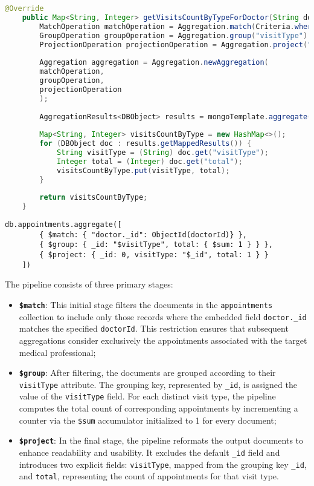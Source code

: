 \begin{lstlisting}[language=java, caption={Java code for the Visit Type Summary analytic}
	]
	@Override
	public Map<String, Integer> getVisitsCountByTypeForDoctor(String doctorId){
		MatchOperation matchOperation = Aggregation.match(Criteria.where("doctor.id").is(doctorId));
		GroupOperation groupOperation = Aggregation.group("visitType").count().as("total");
		ProjectionOperation projectionOperation = Aggregation.project("total").and("visitType").previousOperation();
		
		Aggregation aggregation = Aggregation.newAggregation(
		matchOperation,
		groupOperation,
		projectionOperation
		);
		
		AggregationResults<DBObject> results = mongoTemplate.aggregate(aggregation, Appointment.class, DBObject.class);
		
		Map<String, Integer> visitsCountByType = new HashMap<>();
		for (DBObject doc : results.getMappedResults()) {
			String visitType = (String) doc.get("visitType");
			Integer total = (Integer) doc.get("total");
			visitsCountByType.put(visitType, total);
		}
		
		return visitsCountByType;
	}
\end{lstlisting}

\begin{lstlisting}[language=mongodb, caption={Equivalent MongoDB Aggregation Pipeline for the Visit Type Summary analytic}]
	db.appointments.aggregate([
		{ $match: { "doctor._id": ObjectId(doctorId)} },
		{ $group: { _id: "$visitType", total: { $sum: 1 } } },
		{ $project: { _id: 0, visitType: "$_id", total: 1 } }
	])
\end{lstlisting}


The pipeline consists of three primary stages:
\begin{itemize}
	\item \textbf{\texttt{\$match}}: This initial stage filters the documents in the \texttt{appointments} collection to include only those records where the embedded field \texttt{doctor.\_id} matches the specified \texttt{doctorId}. This restriction ensures that subsequent aggregations consider exclusively the appointments associated with the target medical professional;
	
	\item \textbf{\texttt{\$group}}: After filtering, the documents are grouped according to their \texttt{visitType} attribute. The grouping key, represented by \texttt{\_id}, is assigned the value of the \texttt{visitType} field. For each distinct visit type, the pipeline computes the total count of corresponding appointments by incrementing a counter via the \texttt{\$sum} accumulator initialized to 1 for every document;
	
	\item \textbf{\texttt{\$project}}: In the final stage, the pipeline reformats the output documents to enhance readability and usability. It excludes the default \texttt{\_id} field and introduces two explicit fields: \texttt{visitType}, mapped from the grouping key \texttt{\_id}, and \texttt{total}, representing the count of appointments for that visit type.
	
\end{itemize}

